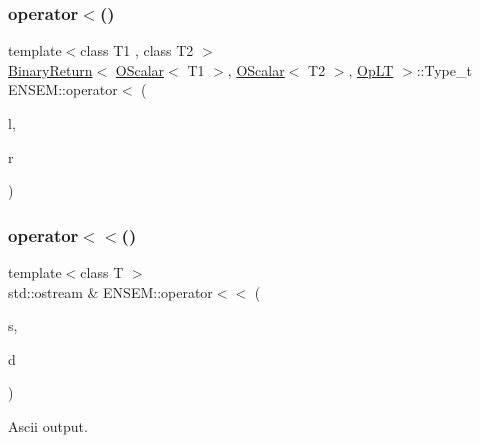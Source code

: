 \mbox{\label{group__obsscalar_gaf1a8a81f23c6d685296f296827d2a4f0}} 
\subsubsection{\texorpdfstring{operator$<$()}{operator<()}}
{\footnotesize\ttfamily template$<$class T1 , class T2 $>$ \\
\mbox{\hyperlink{structENSEM_1_1BinaryReturn}{Binary\+Return}}$<$ \mbox{\hyperlink{classENSEM_1_1OScalar}{O\+Scalar}}$<$ T1 $>$, \mbox{\hyperlink{classENSEM_1_1OScalar}{O\+Scalar}}$<$ T2 $>$, \mbox{\hyperlink{structENSEM_1_1OpLT}{Op\+LT}} $>$\+::Type\+\_\+t E\+N\+S\+E\+M\+::operator$<$ (\begin{DoxyParamCaption}\item[{const \mbox{\hyperlink{classENSEM_1_1OScalar}{O\+Scalar}}$<$ T1 $>$ \&}]{l,  }\item[{const \mbox{\hyperlink{classENSEM_1_1OScalar}{O\+Scalar}}$<$ T2 $>$ \&}]{r }\end{DoxyParamCaption})\hspace{0.3cm}{\ttfamily [inline]}}

\mbox{\label{group__obsscalar_ga7ac0c3b6cd38466c57c199a30f7795cd}} 
\subsubsection{\texorpdfstring{operator$<$$<$()}{operator<<()}\hspace{0.1cm}{\footnotesize\ttfamily [1/4]}}
{\footnotesize\ttfamily template$<$class T $>$ \\
std\+::ostream \& E\+N\+S\+E\+M\+::operator$<$$<$ (\begin{DoxyParamCaption}\item[{std\+::ostream \&}]{s,  }\item[{const \mbox{\hyperlink{classENSEM_1_1OScalar}{O\+Scalar}}$<$ T $>$ \&}]{d }\end{DoxyParamCaption})\hspace{0.3cm}{\ttfamily [inline]}}



Ascii output. 

